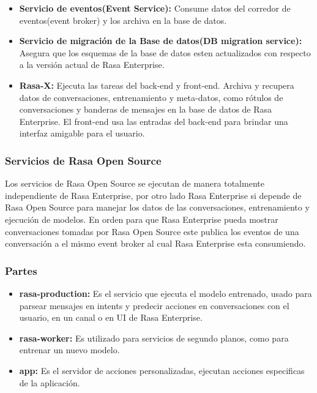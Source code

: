 \begin{itemize}
	\item \textbf{Servicio de eventos(Event Service):} Consume datos del corredor de eventos(event broker) y los archiva en la base de datos.
	\item \textbf{Servicio de migración de la Base de datos(DB migration service):}  Asegura que
	      los esquemas de la base de datos
	      esten actualizados con respecto a la versión actual de Rasa Enterprise.
	\item \textbf{Rasa-X:} Ejecuta las tareas del back-end y front-end. Archiva y recupera datos de
	      conversaciones, entrenamiento y meta-datos, como rótulos de conversaciones y banderas de
	      mensajes en la base de datos de Rasa Enterprise. El front-end usa las entradas del back-end para brindar
	      una interfaz amigable para el usuario.
\end{itemize}

\subsubsection{Servicios de Rasa Open Source}

Los servicios de Rasa Open Source se ejecutan de manera totalmente independiente de Rasa
Enterprise,
por otro lado Rasa Enterprise si depende de Rasa Open Source para manejar los datos de las
conversaciones,
entrenamiento y ejecución de modelos. En orden para que Rasa Enterprise pueda mostrar
conversaciones
tomadas por Rasa Open Source este publica los eventos de una conversación a el mismo event broker
al cual Rasa Enterprise esta consumiendo.

\subsubsection{Partes}

\begin{itemize}
	\item \textbf{rasa-production:} Es el servicio que ejecuta el modelo entrenado, usado para
	      parsear mensajes en intents y predecir acciones en conversaciones con el usuario, en un canal
	      o
	      en UI de Rasa Enterprise.
	\item \textbf{rasa-worker:} Es utilizado para servicios de segundo planos, como para entrenar
	      un
	      nuevo modelo.
	\item \textbf{app:} Es el servidor de acciones personalizadas, ejecutan acciones especificas
	      de la aplicación.
\end{itemize}
